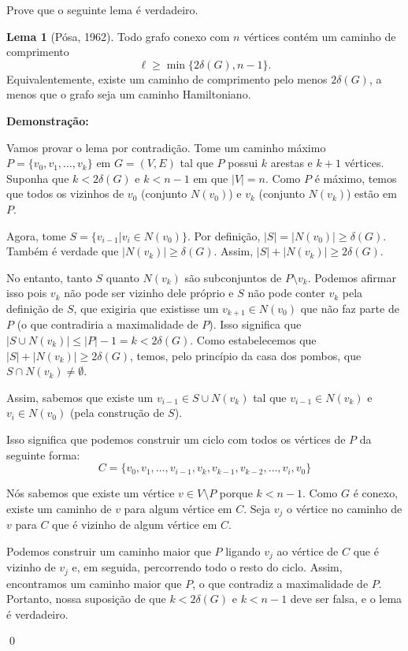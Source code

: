 \documentclass[12pt]{article}
\newenvironment{problem}[2][Exercício]{\begin{trivlist}
\item[\hskip \labelsep {\bfseries #1}\hskip \labelsep {\bfseries #2.}]}{\end{trivlist}}
\newenvironment{sol}
    {\textbf{Demonstração:}\emph{}
    }
    {
    \qed
    }
\begin{document}
\begin{problem}{4}
    Prove que o seguinte lema é verdadeiro.
    
    \textbf{Lema 1} (Pósa, 1962). Todo grafo conexo com $n$ vértices contém um caminho de comprimento
    \[
        \ell \ge \min\{2\delta(G), n-1\}.
    \]
    Equivalentemente, existe um caminho de comprimento pelo menos $2\delta(G)$, a menos que o grafo seja um caminho Hamiltoniano.
\end{problem}
\begin{sol}
    Vamos provar o lema por contradição. Tome um caminho máximo $P=\{v_0, v_1, \ldots, v_k\}$ em $G=(V,E)$ tal que $P$ possui $k$ arestas e $k+1$ vértices.
    Suponha que $k < 2\delta(G)$ e $k < n-1$ em que $|V|=n$. Como $P$ é máximo, temos que todos os vizinhos de $v_0$ (conjunto $N(v_0)$) e $v_k$ (conjunto $N(v_k)$) estão em $P$.

    Agora, tome $S=\{v_{i-1}|v_i\in N(v_0)\}$. Por definição, $|S|=|N(v_0)|\geq \delta(G)$.
    Também é verdade que $|N(v_k)|\geq \delta(G)$. Assim, $|S|+|N(v_k)|\geq 2\delta(G)$.
    
    No entanto, tanto $S$ quanto $N(v_k)$ são subconjuntos de $P\setminus{v_k}$.
    Podemos afirmar isso pois $v_k$ não pode ser vizinho dele próprio e $S$ não pode conter $v_k$ pela definição de $S$,
    que exigiria que existisse um $v_{k+1}\in N(v_0)$ que não faz parte de $P$ (o que contradiria a maximalidade de $P$).
    Isso significa que $|S\cup N(v_k)|\leq|P|-1 = k < 2\delta(G)$.
    Como estabelecemos que $|S|+|N(v_k)|\geq 2\delta(G)$, temos, pelo princípio da casa dos pombos,
    que $S\cap N(v_k)\neq \emptyset$.

    Assim, sabemos que existe um $v_{i-1}\in S\cup N(v_k)$ tal que $v_{i-1}\in N(v_k)$ e $v_i \in N(v_0)$ (pela construção de $S$).

    Isso significa que podemos construir um ciclo com todos os vértices de $P$ da seguinte forma:
    $$C=\{v_0,v_1,\ldots,v_{i-1},v_k,v_{k-1},v_{k-2},\ldots,v_i,v_0\}$$

    Nós sabemos que existe um vértice $v\in V\setminus P$ porque $k<n-1$.
    Como $G$ é conexo, existe um caminho de $v$ para algum vértice em $C$.
    Seja $v_j$ o vértice no caminho de $v$ para $C$ que é vizinho de algum vértice em $C$.

    Podemos construir um caminho maior que $P$ ligando $v_j$ ao vértice de $C$ que é vizinho de $v_j$ e, em seguida,
    percorrendo todo o resto do ciclo. Assim, encontramos um caminho maior que $P$, o que contradiz a maximalidade de $P$.
    Portanto, nossa suposição de que $k < 2\delta(G)$ e $k < n-1$ deve ser falsa, e o lema é verdadeiro.    
\end{sol}
\end{document}
